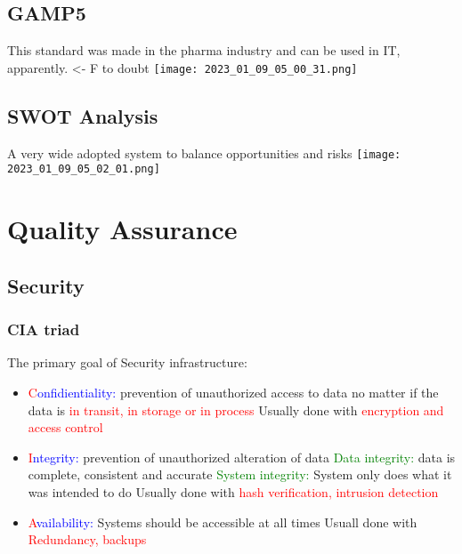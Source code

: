 \documentclass[main.tex,fontsize=12pt,paper=a4,paper=landscape,DIV=calc,]{scrartcl}
\begin{document}
\begin{multicols*}{2}
\subsection{GAMP5}
This standard was made in the pharma industry and can be used in IT, apparently. <- F to doubt\newline
\texttt{[image: 2023\_01\_09\_05\_00\_31.png]}

\subsection{SWOT Analysis}
A very wide adopted system to balance opportunities and risks\newline
\texttt{[image: 2023\_01\_09\_05\_02\_01.png]}

\section{Quality Assurance}

\subsection{Security}
\subsubsection{CIA triad}
The primary goal of Security infrastructure:\newline
\begin{itemize}
  \item \textcolor{red}{C}\textcolor{blue}{onfidientiality:} prevention of unauthorized access to data\newline
{no matter if the data is \textcolor{red}{in transit, in storage or in process}}\newline
{Usually done with \textcolor{red}{encryption and access control}}
\item \textcolor{red}{I}\textcolor{blue}{ntegrity:} prevention of unauthorized alteration of data\newline
{\textcolor{green}{Data integrity:} data is complete, consistent and accurate}\newline
{\textcolor{green}{System integrity:} System only does what it was intended to do}\newline
{Usually  done with \textcolor{red}{hash verification, intrusion detection}}
\item \textcolor{red}{A}\textcolor{blue}{vailability:} Systems should be accessible at all times\newline
{Usuall done with \textcolor{red}{Redundancy, backups}}
\end{itemize} 


\end{multicols*}
\end{document}
